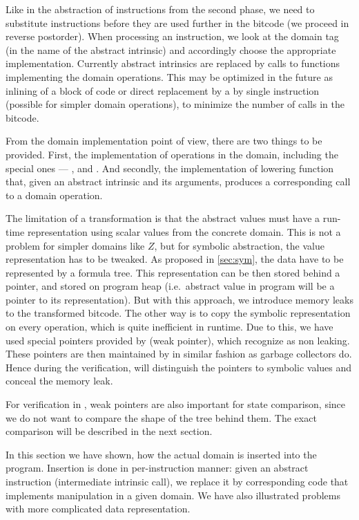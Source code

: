 Like in the abstraction of instructions from the second phase, we need to
substitute instructions before they are used further in the bitcode (we proceed
in reverse postorder). When processing an instruction, we look at the domain tag
(in the name of the abstract intrinsic) and accordingly choose the appropriate
implementation. Currently abstract intrinsics are replaced by calls to functions
implementing the domain operations. This may be optimized in the future as
inlining of a block of code or direct replacement by a by single instruction
(possible for simpler domain operations), to minimize the number of calls in the
bitcode.

From the domain implementation point of view, there are two things to be
provided. First, the implementation of operations in the domain, including
the special ones --- ,  and .
And secondly, the implementation of lowering function that, given an abstract
\LART intrinsic and its arguments, produces a corresponding call to a domain
operation.

The limitation of a transformation is that the abstract values must have a
run-time representation using scalar values from the concrete domain. This is
not a problem for simpler domains like $Z$, but for symbolic abstraction, the
value representation has to be tweaked. As proposed in \autoref{sec:sym}, the
data have to be represented by a formula tree. This representation can be
then stored behind a pointer, and stored on program heap (i.e.~abstract value in
program will be a pointer to its representation). But with this approach, we
introduce memory leaks to the transformed bitcode. The other way is to copy the symbolic
representation on every operation, which is quite inefficient in runtime. Due to
this, we have used special pointers provided by \DIVINE (weak pointer), which
\DIVINE recognize as non leaking. These pointers are then maintained by \DIVM in
similar fashion as garbage collectors do. Hence during the verification, \DIVINE
will distinguish the pointers to symbolic values and conceal the memory leak.

For verification in \DIVINE, weak pointers are also important for state
comparison, since we do not want to compare the shape of the tree behind them.
The exact comparison will be described in the next section.


\begin{summary}
In this section we have shown, how the actual domain is inserted into the
program. Insertion is done in per-instruction manner: given an abstract
instruction (intermediate intrinsic call), we replace it by corresponding code
that implements manipulation in a given domain. We have also illustrated
problems with more complicated data representation.
\end{summary}

